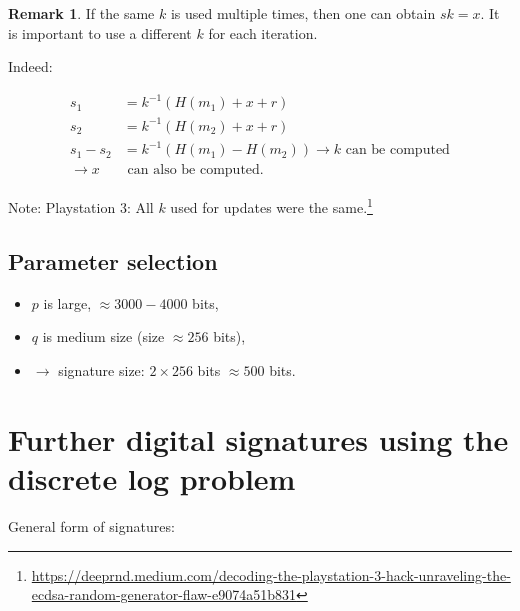 \documentclass[11pt]{article}
\theoremstyle{definition}
\newtheorem{remark}{Remark}[section]
\theoremstyle{proof}
\begin{document}
\begin{remark}
	If the same $k$ is used multiple times, then one can obtain $sk = x$. It is important to use a different $k$ for each iteration.
	
	\noindent Indeed:
	
	\begin{align}
		s_1 &= k^{-1} (H(m_1) + x + r) \\
		s_2 &= k^{-1} (H(m_2) + x + r) \\
		s_1 - s_2 &= k^{-1} (H(m_1) - H(m_2)) \rightarrow k \text{ can be computed}\\
		\rightarrow x &\text{ can also be computed}.
	\end{align}
	
	\noindent Note: Playstation 3: All $k$ used for updates were the same.\footnote{\url{https://deeprnd.medium.com/decoding-the-playstation-3-hack-unraveling-the-ecdsa-random-generator-flaw-e9074a51b831}}
\end{remark}

\subsection{Parameter selection}

\begin{itemize}
	\item $p$ is large, $\approx 3000-4000$ bits,
	\item $q$ is medium size (size $\approx 256$ bits),
	\item $\rightarrow$ signature size: $2 \times 256$ bits $\approx500$ bits.
\end{itemize}

\section{Further digital signatures using the discrete log problem}

General form of signatures:
\end{document}
